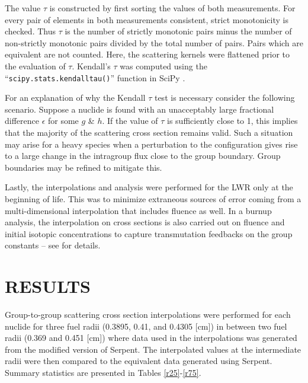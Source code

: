 \documentclass{physor2012}
\begin{document}
The value $\tau$ is constructed by first sorting the values of both measurements.
For every pair of elements in both measurements consistent, strict monotonicity
is checked.  Thus $\tau$ is the number of strictly monotonic pairs minus the number
of non-strictly monotonic pairs divided by the total number of pairs.  
Pairs which are equivalent are not counted.  Here, the scattering kernels
were flattened prior to the evaluation of $\tau$.  Kendall's $\tau$ was 
computed using the ``\texttt{scipy.stats.kendalltau()}'' function in SciPy \cite{SciPy}.

For an explanation of why the Kendall $\tau$ test is necessary consider the following
scenario.  Suppose a nuclide is found with an unacceptably large fractional
difference $\epsilon$ for some $g$ \& $h$.  If the value of $\tau$ is sufficiently
close to 1, this implies that the majority of the scattering cross section
remains valid.  Such a situation may arise for a heavy species when a perturbation 
to the configuration gives rise to a large change in the intragroup flux close to 
the group boundary.  Group boundaries may be refined to mitigate this.

Lastly, the interpolations and analysis were performed for the LWR only
at the beginning of life.  This was to minimize extraneous sources of error
coming from a multi-dimensional interpolation that includes fluence as well.  
In a burnup analysis, the interpolation on cross sections is also carried out 
on fluence and initial isotopic concentrations to capture transmutation feedbacks 
on the group constants -- see \cite{Scopatz2009} for details.

\section{RESULTS}
\label{sec:results}

Group-to-group scattering cross section interpolations were performed for
each nuclide for three fuel radii (0.3895, 0.41, and 0.4305 [cm]) in between two
fuel radii (0.369 and 0.451 [cm]) where data used in the interpolations was generated 
from the modified version of Serpent.  The interpolated values at the intermediate 
radii were then compared to the equivalent data generated using Serpent.  Summary 
statistics are presented in Tables \ref{r25}-\ref{r75}.
\end{document}
